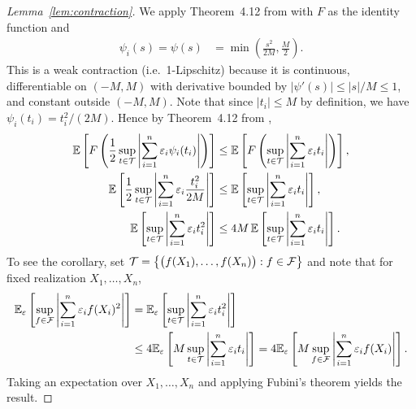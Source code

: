 \begin{proof}[Lemma~\ref{lem:contraction}]

  We apply Theorem~4.12
  from \citet{ledoux1991probability}
  with $F$ as the identity function
  and
  \begin{align*}
    \psi_i(s)
    = \psi(s)
    &=
    \min
    \left(
      \frac{s^2}{2M},
      \frac{M}{2}
    \right).
  \end{align*}
  This is a weak contraction
  (i.e.\ 1-Lipschitz)
  because it is continuous,
  differentiable on $(-M,M)$
  with derivative bounded by
  $|\psi'(s)| \leq |s|/M \leq 1$,
  and constant outside $(-M,M)$.
  Note that since $|t_i| \leq M$
  by definition,
  we have $\psi_i(t_i) = t_i^2 / (2M)$.
  Hence
  by Theorem~4.12
  from \citet{ledoux1991probability},
  \begin{align*}
    \mathbb{E}
    \left[
      F
      \left(
        \frac{1}{2}
        \sup_{t \in \mathcal{T}}
        \left|
        \sum_{i=1}^n
        \varepsilon_i
        \psi_i(t_i)
        \right|
      \right)
    \right]
    &\leq
    \mathbb{E}
    \left[
      F
      \left(
        \sup_{t \in \mathcal{T}}
        \left|
        \sum_{i=1}^n
        \varepsilon_i
        t_i
        \right|
      \right)
    \right], \\
    \mathbb{E}
    \left[
      \frac{1}{2}
      \sup_{t \in \mathcal{T}}
      \left|
      \sum_{i=1}^n
      \varepsilon_i
      \frac{t_i^2}{2M}
      \right|
    \right]
    &\leq
    \mathbb{E}
    \left[
      \sup_{t \in \mathcal{T}}
      \left|
      \sum_{i=1}^n
      \varepsilon_i
      t_i
      \right|
    \right], \\
    \mathbb{E}
    \left[
      \sup_{t \in \mathcal{T}}
      \left|
      \sum_{i=1}^n
      \varepsilon_i
      t_i^2
      \right|
    \right]
    &\leq
    4M \,
    \mathbb{E}
    \left[
      \sup_{t \in \mathcal{T}}
      \left|
      \sum_{i=1}^n
      \varepsilon_i
      t_i
      \right|
    \right].
  \end{align*}
  To see the corollary,
  set
  $\mathcal{T} = \left\{\big(f(X_1), \ldots, f(X_n)\big) : f \in \mathcal{F}\right\}$
  and note that for fixed realization
  $X_1, \ldots, X_n$,
  \begin{align*}
    \mathbb{E}_\varepsilon
    \left[
      \sup_{f \in \mathcal{F}}
      \left|
      \sum_{i=1}^n
      \varepsilon_i
      f(X_i)^2
      \right|
    \right]
    &=
    \mathbb{E}_\varepsilon
    \left[
      \sup_{t \in \mathcal{T}}
      \left|
      \sum_{i=1}^n
      \varepsilon_i
      t_i^2
      \right|
    \right] \\
    &\leq 4
    \mathbb{E}_\varepsilon
    \left[
      M
      \sup_{t \in \mathcal{T}}
      \left|
      \sum_{i=1}^n
      \varepsilon_i
      t_i
      \right|
    \right]
    = 4 \mathbb{E}_\varepsilon
    \left[
      M
      \sup_{f \in \mathcal{F}}
      \left|
      \sum_{i=1}^n
      \varepsilon_i
      f(X_i)
      \right|
    \right].
  \end{align*}
  Taking an expectation over $X_1, \ldots, X_n$
  and applying Fubini's theorem yields the result.
\end{proof}

